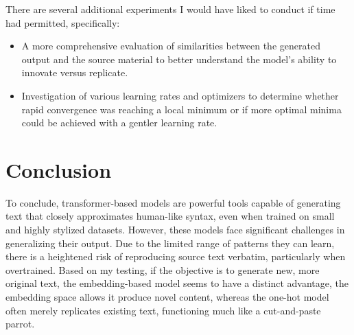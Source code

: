 \documentclass[12pt]{article} \usepackage{COSC420style} \usepackage{soul}
\begin{document}
There are several additional experiments I would have liked to conduct if time had permitted, specifically:

\begin{itemize}
	\item A more comprehensive evaluation of similarities between the generated
	      output and the source material to better understand the model's ability
	      to innovate versus replicate.

	\item Investigation of various learning rates and optimizers to determine
	      whether rapid convergence was reaching a local minimum or if more
	      optimal minima could be achieved with a gentler learning rate.

\end{itemize}

\section{Conclusion}

To conclude, transformer-based models are powerful tools capable of generating
text that closely approximates human-like syntax, even when trained on small and
highly stylized datasets. However, these models face significant challenges in
generalizing their output. Due to the limited range of patterns they can learn,
there is a heightened risk of reproducing source text verbatim, particularly
when overtrained. Based on my testing, if the objective is to generate new, more
original text, the embedding-based model seems to have a distinct advantage, the
embedding space allows it produce novel content, whereas the one-hot model often
merely replicates existing text, functioning much like a cut-and-paste parrot.
\end{document}
